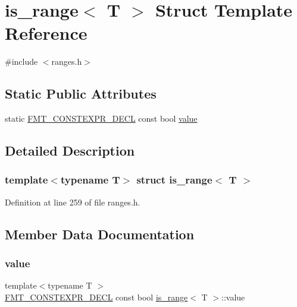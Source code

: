 \hypertarget{structis__range}{}\section{is\+\_\+range$<$ T $>$ Struct Template Reference}
\label{structis__range}


{\ttfamily \#include $<$ranges.\+h$>$}

\subsection*{Static Public Attributes}
\begin{DoxyCompactItemize}
\item 
static \hyperlink{core_8h_af4388801466a5994a363d6005616371a}{F\+M\+T\+\_\+\+C\+O\+N\+S\+T\+E\+X\+P\+R\+\_\+\+D\+E\+CL} const bool \hyperlink{structis__range_a32768ddd51e9772f32ea6788627fd6a0}{value}
\end{DoxyCompactItemize}


\subsection{Detailed Description}
\subsubsection*{template$<$typename T$>$\newline
struct is\+\_\+range$<$ T $>$}



Definition at line 259 of file ranges.\+h.



\subsection{Member Data Documentation}
\mbox{\label{structis__range_a32768ddd51e9772f32ea6788627fd6a0}} 
\subsubsection{\texorpdfstring{value}{value}}
{\footnotesize\ttfamily template$<$typename T $>$ \\
\hyperlink{core_8h_af4388801466a5994a363d6005616371a}{F\+M\+T\+\_\+\+C\+O\+N\+S\+T\+E\+X\+P\+R\+\_\+\+D\+E\+CL} const bool \hyperlink{structis__range}{is\+\_\+range}$<$ T $>$\+::value\hspace{0.3cm}{\ttfamily [static]}}

